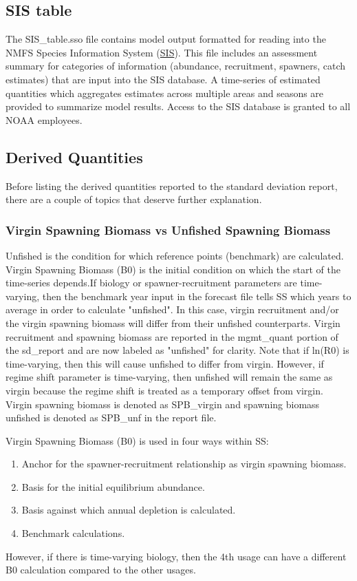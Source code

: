 \subsection{SIS table}
The SIS\_table.sso file contains model output formatted for reading into the NMFS Species Information System (\href{https://www.st.nmfs.noaa.gov/sis/}{SIS}). This file includes an assessment summary for categories of information (abundance, recruitment, spawners, catch estimates) that are input into the SIS database. A time-series of estimated quantities which aggregates estimates across multiple areas and seasons are provided to summarize model results. Access to the SIS database is granted to all NOAA employees.

\subsection{Derived Quantities}
Before listing the derived quantities reported to the standard deviation report, there are a couple of topics that deserve further explanation.

\hypertarget{VirginUnfished}{}
\subsubsection{Virgin Spawning Biomass vs Unfished Spawning Biomass}
Unfished is the condition for which reference points (benchmark) are calculated.  Virgin Spawning Biomass (B0) is the initial condition on which the start of the time-series depends.If biology or spawner-recruitment parameters are time-varying, then the benchmark year input in the forecast file tells SS which years to average in order to calculate "unfished". In this case, virgin recruitment and/or the virgin spawning biomass will differ from their unfished counterparts. Virgin recruitment and spawning biomass are reported in the mgmt\_quant portion of the sd\_report and are now labeled as "unfished" for clarity.  Note that if ln(R0) is time-varying, then this will cause unfished to differ from virgin. However, if regime shift parameter is time-varying, then unfished will remain the same as virgin because the regime shift is treated as a temporary offset from virgin. Virgin spawning biomass is denoted as SPB\_virgin and spawning biomass unfished is denoted as SPB\_unf in the report file.

Virgin Spawning Biomass (B0) is used in four ways within SS:
\begin{enumerate}
	\item Anchor for the spawner-recruitment relationship as virgin spawning biomass.
	\item Basis for the initial equilibrium abundance. 
	\item Basis against which annual depletion is calculated.
	\item Benchmark calculations.
\end{enumerate}
However, if there is time-varying biology, then the 4th usage can have a different B0 calculation compared to the other usages.

